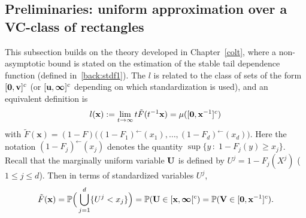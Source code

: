 \subsection{Preliminaries: uniform approximation over a VC-class of rectangles}
\label{jmva:sec:rectangles}
This subsection builds on the theory developed in Chapter~\ref{colt}, where a non-asymptotic bound is stated on the estimation of the stable tail dependence function (defined in~\eqref{back:stdf1}). %
The \stdf $l$ is related to the class of sets of the form $[\mathbf 0, \mathbf v]^c$ (or $[\mathbf u, \boldsymbol{\infty}]^c$ depending on which standardization is used), and an equivalent definition is 
\begin{align}
\label{jmva:stdf}
l(\mathbf{x}):= \lim_{t \to \infty} t \tilde F (t^{-1}\mathbf{x}) = \mu([\mathbf 0, \mathbf x ^{-1}]^c) 
\end{align}
\noindent
with $\tilde F (\mathbf{x}) = (1-F) \big( (1-F_1)^\leftarrow(x_1),\ldots, (1-F_d)^\leftarrow(x_d)  \big)$.
 Here the notation
$(1-F_j)^\leftarrow(x_j)$ denotes the quantity $\sup\{y\,:\; 1-F_j(y) \ge x_j\}$. Recall that the marginally uniform variable $\mathbf U$ is defined by  $U^j = 1-F_j(X^j)$ ($1\le j\le d$). Then  in terms of standardized variables $U^j$, 
\begin{align}
\label{jmva:def:tildeF}
\tilde F(\mathbf x) = \mathbb{P}\Big(\bigcup_{j=1}^d\{U^j< x_j\}\Big) = \mathbb{P}(\mathbf
U\in [\mathbf x, \boldsymbol{\infty}[^c) = \mathbb{P}(\mathbf V \in [\mathbf 0, \mathbf x^{-1}]^c). 
\end{align}

